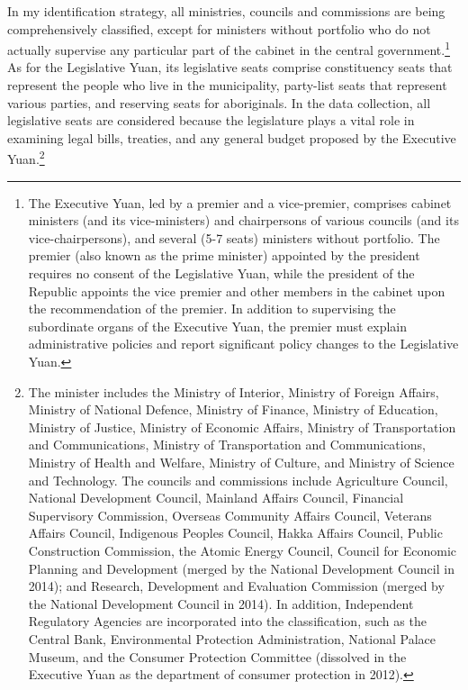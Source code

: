 In my identification strategy, all ministries, councils and commissions are being comprehensively classified, except for ministers without portfolio who do not actually supervise any particular part of the cabinet in the central government.\footnote{The Executive Yuan, led by a premier and a vice-premier, comprises cabinet ministers (and its vice-ministers) and chairpersons of various councils (and its vice-chairpersons), and several (5-7 seats) ministers without portfolio. The premier (also known as the prime minister) appointed by the president requires no consent of the Legislative Yuan, while the president of the Republic appoints the vice premier and other members in the cabinet upon the recommendation of the premier. In addition to supervising the subordinate organs of the Executive Yuan, the premier must explain administrative policies and report significant policy changes to the Legislative Yuan.} As for the Legislative Yuan, its legislative seats comprise constituency seats that represent the people who live in the municipality, party-list seats that represent various parties, and reserving seats for aboriginals. In the data collection, all legislative seats are considered because the legislature plays a vital role in examining legal bills, treaties, and any general budget proposed by the Executive Yuan.\footnote{The minister includes the Ministry of Interior, Ministry of Foreign Affairs, Ministry of National Defence, Ministry of Finance, Ministry of Education, Ministry of Justice, Ministry of Economic Affairs, Ministry of Transportation and Communications, Ministry of Transportation and Communications, Ministry of Health and Welfare, Ministry of Culture, and Ministry of Science and Technology. The councils and commissions include Agriculture Council, National Development Council, Mainland Affairs Council, Financial Supervisory Commission, Overseas Community Affairs Council, Veterans Affairs Council, Indigenous Peoples Council, Hakka Affairs Council, Public Construction Commission, the Atomic Energy Council, Council for Economic Planning and Development (merged by the National Development Council in 2014); and Research, Development and Evaluation Commission (merged by the National Development Council in 2014). In addition, Independent Regulatory Agencies are incorporated into the classification, such as the Central Bank, Environmental Protection Administration, National Palace Museum, and the Consumer Protection Committee (dissolved in the Executive Yuan as the department of consumer protection in 2012).} 


